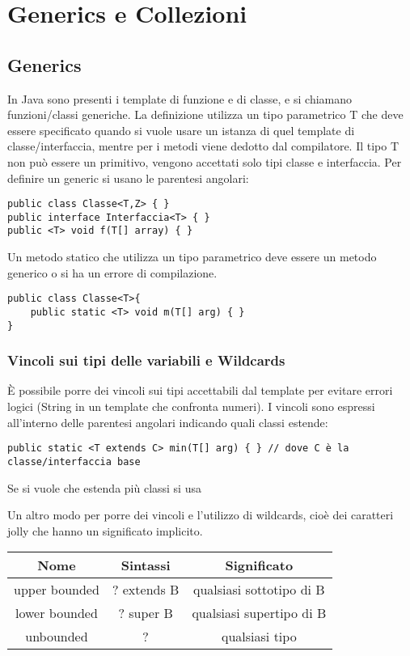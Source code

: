 \chapter{Generics e Collezioni}

\section{Generics}
In Java sono presenti i template di funzione e di classe, e si chiamano funzioni/classi generiche. La definizione utilizza un tipo parametrico T che deve essere specificato quando si vuole usare un istanza di quel template di classe/interfaccia, mentre per i metodi viene dedotto dal compilatore. Il tipo T non può essere un primitivo, vengono accettati solo tipi classe e interfaccia.
Per definire un generic si usano le parentesi angolari:
\begin{verbatim}
public class Classe<T,Z> { }
public interface Interfaccia<T> { }
public <T> void f(T[] array) { }
\end{verbatim}

Un metodo statico che utilizza un tipo parametrico deve essere un metodo generico o si ha un errore di compilazione. 
\begin{verbatim}
public class Classe<T>{
	public static <T> void m(T[] arg) { }
}
\end{verbatim}

\subsection*{Vincoli sui tipi delle variabili e Wildcards} %
È possibile porre dei vincoli sui tipi accettabili dal template per evitare errori logici (String in un template che confronta numeri). I vincoli sono espressi all'interno delle parentesi angolari indicando quali classi estende:

\begin{verbatim}
public static <T extends C> min(T[] arg) { } // dove C è la classe/interfaccia base
\end{verbatim}

Se si vuole che estenda più classi si usa %

Un altro modo per porre dei vincoli e l'utilizzo di wildcards, cioè dei caratteri jolly che hanno un significato implicito.

\begin{table}
\begin{tabular}{|c|c|c|}
\hline
Nome & Sintassi & Significato \\
\hline
upper bounded & ? extends B & qualsiasi sottotipo di B \\
\hline
lower bounded & ? super B & qualsiasi supertipo di B \\
\hline
unbounded & ? & qualsiasi tipo \\
\hline
\end{tabular}
\end{table}

